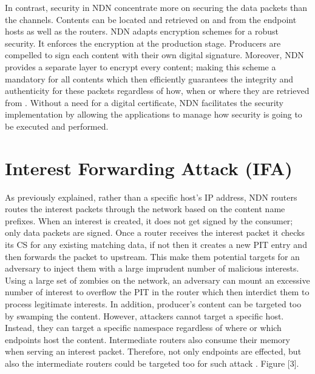 \documentclass[twocolumn]{article}
\begin{document}
In contrast, security in NDN concentrate more on securing the data packets than the channels. Contents can be located and retrieved on and from the endpoint hosts as well as the routers. NDN adapts encryption schemes for a robust security. It enforces the encryption at the production stage. Producers are compelled to sign each content with their own digital signature. Moreover, NDN provides a separate layer to encrypt every content; making this scheme a mandatory for all contents which then efficiently guarantees the integrity and authenticity for these packets regardless of how, when or where they are retrieved from \cite{Gasti2013}. Without a need for a digital certificate, NDN facilitates the security implementation by allowing the applications to manage how security is going to be executed and performed.     

   



\section{Interest Forwarding Attack (IFA)}

As previously explained, rather than a specific host’s IP address, NDN routers routes the interest packets through the network based on the content name prefixes. When an interest is created, it does not get signed by the consumer; only data packets are signed\cite{Gasti2013}. Once a router receives the interest packet it checks its CS for any existing matching data, if not then it creates a new PIT entry and then forwards the packet to upstream. This make them potential targets for an adversary to inject them with a large imprudent number of malicious interests. Using a large set of zombies on the network, an adversary can mount an excessive number of interest to overflow the PIT in the router which then interdict them to process legitimate interests. In addition, producer's content can be targeted too by swamping the content.  However, attackers cannot target a specific host. Instead, they can target a specific namespace regardless of where or which endpoints host the content. Intermediate routers also consume their memory when serving an interest packet. Therefore, not only endpoints are effected, but also the intermediate routers could be targeted too for such attack \cite{6663516}\cite{KARAMI20151262}. Figure [3].
\end{document}
